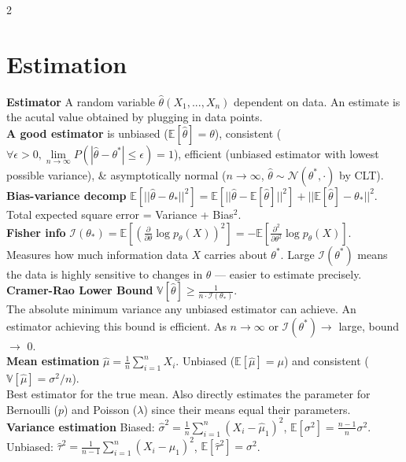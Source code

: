 \documentclass[10pt]{article}
\begin{document}
\begin{multicols*}{2}
\section*{Estimation}
\textbf{Estimator} A random variable $\hat{\theta}(X_1, ..., X_n)$ dependent on data. An estimate is the acutal value obtained by plugging in data points.\\
\textbf{A good estimator} is unbiased ($\mathbb{E}[\hat{\theta}] = \theta$), consistent ($\forall \epsilon > 0, \lim\limits_{n\to\infty}P(|\hat{\theta} - \theta^*|\leq\epsilon)=1$),
efficient (unbiased estimator with lowest possible variance), \& asymptotically normal ($n\to\infty$, $\hat{\theta}\sim\mathcal{N}(\theta^*,\cdot)$ by CLT).\\
\textbf{Bias-variance decomp} $\mathbb{E}[||\hat{\theta} - \theta_*||^2] = \mathbb{E}[||\hat{\theta} - \mathbb{E}[\hat{\theta}]||^2] + ||\mathbb{E}[\hat{\theta}] - \theta_*||^2$.\\
Total expected square error = Variance + Bias$^2$.\\
\textbf{Fisher info} $\mathcal{I}(\theta_*) = \mathbb{E}[(\frac{\partial}{\partial\theta} \log p_\theta(X))^2] = -\mathbb{E}\left[\frac{\partial^2}{\partial \theta^2} \log p_\theta(X)\right]$.\\
Measures how much information data $X$ carries about $\theta^*$. Large $\mathcal{I}(\theta^*)$ means the data is highly sensitive to changes in $\theta$ — easier to estimate precisely.\\
\textbf{Cramer-Rao Lower Bound} $\mathbb{V}[\hat{\theta}] \ge \frac{1}{n \cdot \mathcal{I}(\theta_*)}$.\\
The absolute minimum variance any unbiased estimator can achieve. An estimator achieving this bound is efficient. As $n\to\infty$ or $\mathcal{I}(\theta^*) \to$ large, bound $\to$ 0.\\
\textbf{Mean estimation} $\hat{\mu} = \frac{1}{n}\sum_{i=1}^n X_i$. Unbiased ($\mathbb{E}[\hat{\mu}]=\mu$) and consistent ($\mathbb{V}[\hat{\mu}]=\sigma^2/n$).\\
Best estimator for the true mean. Also directly estimates the parameter for Bernoulli ($p$) and Poisson ($\lambda$) since their means equal their parameters.\\
\textbf{Variance estimation} Biased: $\hat{\sigma}^2 = \frac{1}{n}\sum_{i=1}^n(X_i - \hat{\mu}_1)^2$, $\mathbb{E}[\sigma^2]=\frac{n-1}{n}\sigma^2$.\\
Unbiased: $\hat{\tau}^2 = \frac{1}{n-1}\sum_{i=1}^n(X_i - \hat{\mu}_1)^2$, $\mathbb{E}[\hat{\tau}^2]=\sigma^2$.\\

\end{multicols*}
\end{document}
